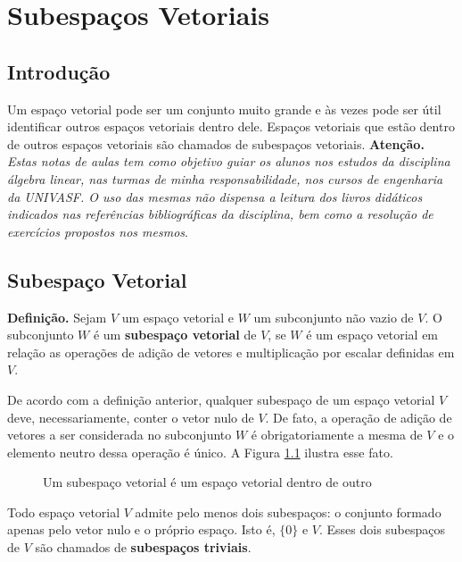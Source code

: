 \chapter{Subespaços Vetoriais}
\thispagestyle{empty}

\section{Introdução}
Um espaço vetorial pode ser um conjunto muito grande e às vezes  pode ser útil identificar outros espaços vetoriais dentro dele. Espaços vetoriais que estão dentro de outros espaços vetoriais são chamados de subespaços vetoriais.   \textbf{Atenção.} \textit{Estas notas de aulas tem como objetivo guiar os alunos nos  estudos da disciplina álgebra linear, nas turmas de minha responsabilidade, nos cursos de engenharia da UNIVASF. O uso das mesmas  não dispensa  a leitura  dos livros didáticos indicados nas referências bibliográficas da disciplina, bem como a resolução de exercícios propostos nos mesmos}.

\section{Subespaço Vetorial}


\textbf{Definição.} Sejam $V$ um espaço vetorial e $ W$ um subconjunto  não vazio de $V$.  O subconjunto  $W$ é um \textbf{subespaço vetorial} de $V$,  se $W$ é um espaço vetorial  em relação as operações  de adição de vetores e multiplicação por escalar definidas em $V$.

\vspace{0.3cm}

De acordo com a definição anterior, qualquer subespaço de  um espaço vetorial  $V$ deve, necessariamente, conter o vetor nulo de $V$. De fato, a operação de adição de vetores a ser considerada no subconjunto $W$ é  obrigatoriamente a mesma de $V$ e o elemento neutro dessa operação é único.  A Figura \ref{fig:subespaco} ilustra esse fato.



\begin{figure}[h!]
\center
\caption{\footnotesize{Um subespaço vetorial é um espaço vetorial dentro de outro}}
\label{fig:subespaco}
\end{figure}


Todo espaço vetorial $V$ admite pelo menos dois subespaços: o conjunto formado apenas pelo vetor nulo  e o próprio espaço. Isto é,  $\{ 0\}$ e  $V$. Esses dois subespaços de $V$  são chamados de \textbf{subespaços triviais}.


